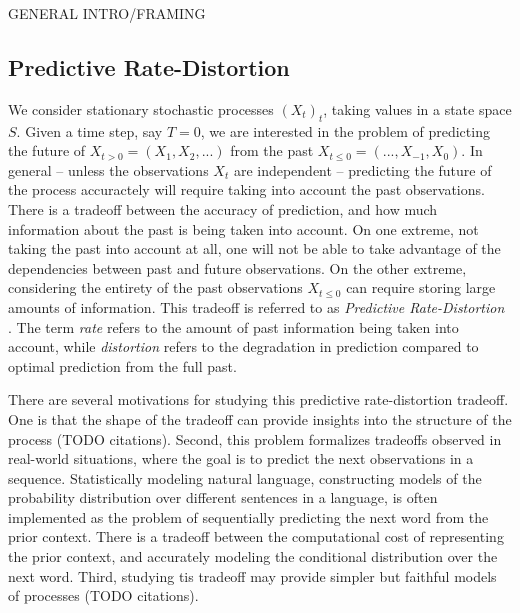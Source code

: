 \documentclass[11pt,letterpaper]{article}
\begin{document}
GENERAL INTRO/FRAMING





\subsection{Predictive Rate-Distortion}


We consider stationary stochastic processes $(X_t)_t$, taking values in a state space $S$.
Given a time step, say $T=0$, we are interested in the problem of predicting the future of $X_{t>0} = (X_1, X_2, ...)$ from the past $X_{t\leq 0} = (..., X_{-1}, X_0)$.
In general -- unless the observations $X_t$ are independent -- predicting the future of the process accuractely will require taking into account the past observations.
There is a tradeoff between the accuracy of prediction, and how much information about the past is being taken into account.
On one extreme, not taking the past into account at all, one will not be able to take advantage of the dependencies between past and future observations.
On the other extreme, considering the entirety of the past observations $X_{t \leq 0}$ can require storing large amounts of information.
This tradeoff is referred to as \emph{Predictive Rate-Distortion} \citep{marzen-predictive-2016}.
The term \emph{rate} refers to the amount of past information being taken into account, while \emph{distortion} refers to the degradation in prediction compared to optimal prediction from the full past.


There are several motivations for studying this predictive rate-distortion tradeoff.
One is that the shape of the tradeoff can provide insights into the structure of the process (TODO citations).
Second, this problem formalizes tradeoffs observed in real-world situations, where the goal is to predict the next observations in a sequence.
Statistically modeling natural language, constructing models of the probability distribution over different sentences in a language, is often implemented as the problem of sequentially predicting the next word from the prior context.
There is a tradeoff between the computational cost of representing the prior context, and accurately modeling the conditional distribution over the next word.
Third, studying tis tradeoff may provide simpler but faithful models of processes (TODO citations).
\end{document}
